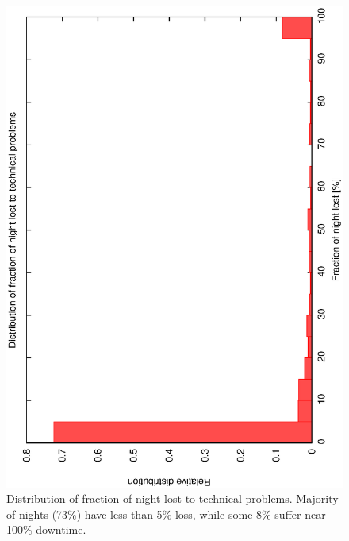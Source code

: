 \begin{figure}[htbp]  
  \begin{center}
    \includegraphics[scale=0.4, angle=-90]{figures/ecs/tech_loss_frac.eps}
  \end{center}
  \caption[Distribution of fraction of night lost to technical problems.]
   {Distribution of fraction of night lost to technical problems. Majority of nights (73\%) have less than 5\% loss, while some 8\% suffer near 100\% downtime.}
  \label{fig:tech_loss_dist}
\end{figure}

